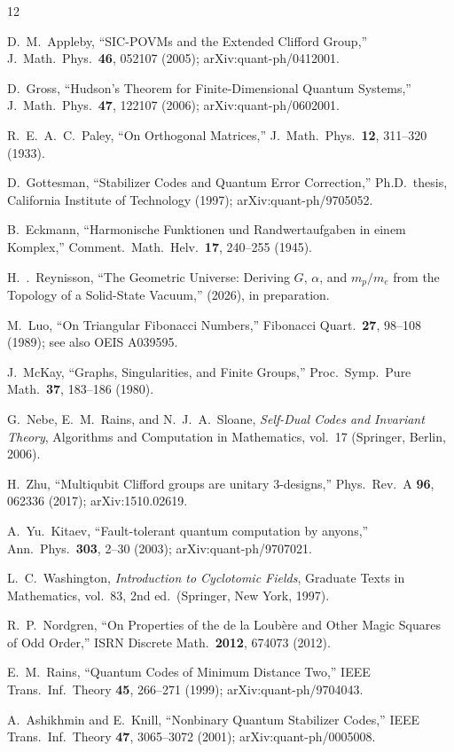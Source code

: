 \documentclass[aip,jmp,reprint,superscriptaddress,floatfix,nofootinbib]{revtex4-2}
\theoremstyle{definition}
\theoremstyle{remark}
\begin{document}
\begin{thebibliography}{12}

D.~M.~Appleby,
``{SIC-POVMs} and the Extended {Clifford} Group,''
J.~Math.\ Phys.\ \textbf{46}, 052107 (2005);
arXiv:quant-ph/0412001.

D.~Gross,
``{Hudson's} Theorem for Finite-Dimensional Quantum Systems,''
J.~Math.\ Phys.\ \textbf{47}, 122107 (2006);
arXiv:quant-ph/0602001.

R.~E.~A.~C.~Paley,
``On Orthogonal Matrices,''
J.~Math.\ Phys.\ \textbf{12}, 311--320 (1933).

D.~Gottesman,
``Stabilizer Codes and Quantum Error Correction,''
Ph.D.\ thesis, California Institute of Technology (1997);
arXiv:quant-ph/9705052.

B.~Eckmann,
``{Harmonische Funktionen und Randwertaufgaben in einem Komplex},''
Comment.\ Math.\ Helv.\ \textbf{17}, 240--255 (1945).

H.~{\TH}.~Reynisson,
``{The Geometric Universe}: Deriving $G$, $\alpha$, and $m_p/m_e$
from the Topology of a Solid-State Vacuum,''
(2026), in preparation.

M.~Luo,
``On Triangular {Fibonacci} Numbers,''
Fibonacci Quart.\ \textbf{27}, 98--108 (1989);
see also OEIS A039595.

J.~McKay,
``Graphs, Singularities, and Finite Groups,''
Proc.\ Symp.\ Pure Math.\ \textbf{37}, 183--186 (1980).

G.~Nebe, E.~M.~Rains, and N.~J.~A.~Sloane,
\emph{Self-Dual Codes and Invariant Theory},
Algorithms and Computation in Mathematics, vol.~17
(Springer, Berlin, 2006).

H.~Zhu,
``Multiqubit {Clifford} groups are unitary 3-designs,''
Phys.\ Rev.\ A \textbf{96}, 062336 (2017);
arXiv:1510.02619.

A.~Yu.~Kitaev,
``Fault-tolerant quantum computation by anyons,''
Ann.\ Phys.\ \textbf{303}, 2--30 (2003);
arXiv:quant-ph/9707021.

L.~C.~Washington,
\emph{Introduction to Cyclotomic Fields},
Graduate Texts in Mathematics, vol.~83,
2nd ed.\ (Springer, New York, 1997).

R.~P.~Nordgren,
``On Properties of the de la Loub\`{e}re and Other Magic Squares of
Odd Order,''
ISRN Discrete Math.\ \textbf{2012}, 674073 (2012).

E.~M.~Rains,
``Quantum Codes of Minimum Distance Two,''
IEEE Trans.\ Inf.\ Theory \textbf{45}, 266--271 (1999);
arXiv:quant-ph/9704043.

A.~Ashikhmin and E.~Knill,
``Nonbinary Quantum Stabilizer Codes,''
IEEE Trans.\ Inf.\ Theory \textbf{47}, 3065--3072 (2001);
arXiv:quant-ph/0005008.

\end{thebibliography}
\end{document}
